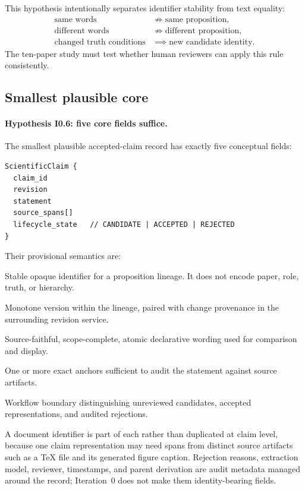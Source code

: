 This hypothesis intentionally separates identifier stability from text equality:
\begin{align*}
\text{same words} &\not\Rightarrow \text{same proposition},\\
\text{different words} &\not\Rightarrow \text{different proposition},\\
\text{changed truth conditions} &\implies \text{new candidate identity}.
\end{align*}
The ten-paper study must test whether human reviewers can apply this rule consistently.

\subsection{Smallest plausible core}

\paragraph{Hypothesis I0.6: five core fields suffice.}
The smallest plausible accepted-claim record has exactly five conceptual fields:
\begin{lstlisting}[style=interface]
ScientificClaim {
  claim_id
  revision
  statement
  source_spans[]
  lifecycle_state   // CANDIDATE | ACCEPTED | REJECTED
}
\end{lstlisting}
Their provisional semantics are:
\begin{description}[style=nextline]
  \item[\field{claim\_id}] Stable opaque identifier for a proposition lineage. It does not encode paper, role, truth, or hierarchy.
  \item[\field{revision}] Monotone version within the lineage, paired with change provenance in the surrounding revision service.
  \item[\field{statement}] Source-faithful, scope-complete, atomic declarative wording used for comparison and display.
  \item[\field{source\_spans}] One or more exact anchors sufficient to audit the statement against source artifacts.
  \item[\field{lifecycle\_state}] Workflow boundary distinguishing unreviewed candidates, accepted representations, and audited rejections.
\end{description}
A document identifier is part of each \SourceSpan{} rather than duplicated at claim level, because one claim representation may need spans from distinct source artifacts such as a TeX file and its generated figure caption. Rejection reasons, extraction model, reviewer, timestamps, and parent derivation are audit metadata managed around the record; Iteration~0 does not make them identity-bearing fields.

